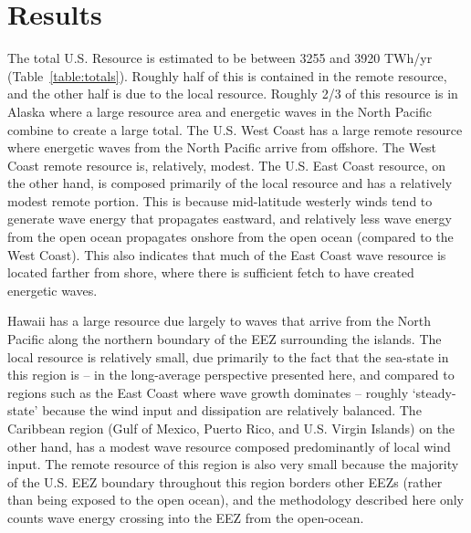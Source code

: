 \section{Results}

The total U.S. Resource is estimated to be between 3255 and 3920 TWh/yr (Table~\ref{table:totals}). Roughly half of this is contained in the remote resource, and the other half is due to the local resource. Roughly 2/3 of this resource is in Alaska where a large resource area and energetic waves in the North Pacific combine to create a large total. The U.S. West Coast has a large remote resource where energetic waves from the North Pacific arrive from offshore.  The West Coast remote resource is, relatively, modest. The U.S. East Coast resource, on the other hand, is composed primarily of the local resource and has a relatively modest remote portion. This is because mid-latitude westerly winds tend to generate wave energy that propagates eastward, and relatively less wave energy from the open ocean propagates onshore from the open ocean (compared to the West Coast). This also indicates that much of the East Coast wave resource is located farther from shore, where there is sufficient fetch to have created energetic waves. 

Hawaii has a large resource due largely to waves that arrive from the North Pacific along the northern boundary of the EEZ surrounding the islands. The local resource is relatively small, due primarily to the fact that the sea-state in this region is -- in the long-average perspective presented here, and compared to regions such as the East Coast where wave growth dominates -- roughly `steady-state' because the wind input and dissipation are relatively balanced. The Caribbean region (Gulf of Mexico, Puerto Rico, and U.S. Virgin Islands) on the other hand, has a modest wave resource composed predominantly of local wind input.  The remote resource of this region is also very small because the majority of the U.S. EEZ boundary throughout this region borders other EEZs (rather than being exposed to the open ocean), and the methodology described here only counts wave energy crossing into the EEZ from the open-ocean. 

